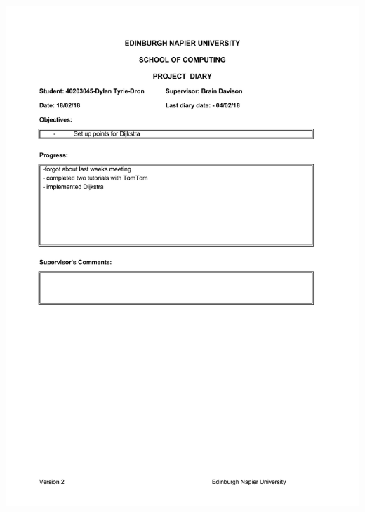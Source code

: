 \documentclass[12pt,a4paper]{article}
\begin{document}
\begin{appendices}
\includegraphics[width=\textwidth,height=\textheight,keepaspectratio]{project_diary_11th_entry.pdf}

\end{appendices}
\end{document}
